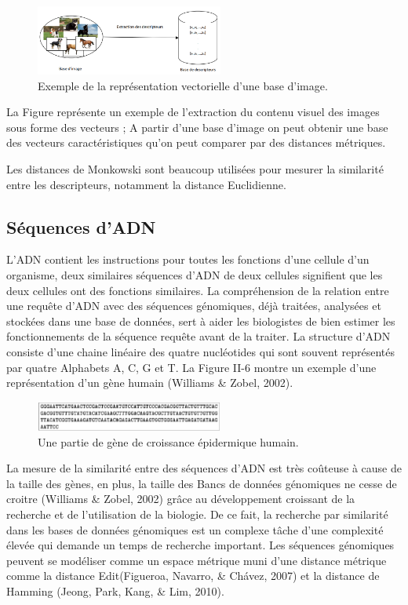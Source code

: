 \begin{figure}[H]
	\centering
	\includegraphics[width=0.55\textwidth]{Figures/extract} %
	\caption{Exemple de la représentation vectorielle d'une base d'image.}
\end{figure}
La Figure  représente un exemple de l’extraction du contenu visuel des images sous
forme des vecteurs ; A partir d’une base d’image on peut obtenir une base des vecteurs
caractéristiques qu’on peut comparer par des distances métriques.

Les distances de Monkowski sont beaucoup utilisées pour mesurer la similarité entre
les descripteurs, notamment la distance Euclidienne. 

\subsection{Séquences d’ADN}
L'ADN contient les instructions pour toutes les fonctions d’une cellule d’un organisme, deux similaires séquences d’ADN de deux cellules signifient que les deux cellules ont des fonctions similaires. La compréhension de la relation entre une requête d’ADN avec des séquences génomiques, déjà traitées, analysées et stockées dans une base de données, sert à aider les biologistes de bien estimer les fonctionnements de la séquence requête avant de la traiter. La structure d’ADN consiste d’une chaine linéaire des quatre nucléotides qui sont souvent représentés par quatre Alphabets A, C, G et T. La Figure II-6 montre un exemple d’une
représentation d’un gène humain (Williams \& Zobel, 2002).

\begin{figure}[H]
	\centering
	\includegraphics[width=0.55\textwidth]{Figures/ADN} %
	\caption{Une partie de gène de croissance épidermique humain.}
\end{figure}
La mesure de la similarité entre des séquences d’ADN est très coûteuse à cause de la taille des gènes, en plus, la taille des Bancs de données génomiques ne cesse de croitre (Williams \& Zobel, 2002) grâce au développement croissant de la recherche et de l’utilisation de la biologie. De ce fait, la recherche par similarité dans les bases de données génomiques est un complexe tâche d’une complexité élevée qui demande un temps de recherche important.
Les séquences génomiques peuvent se modéliser comme un espace métrique muni
d’une distance métrique comme la distance Edit(Figueroa, Navarro, \& Chávez, 2007) et la distance de Hamming (Jeong, Park, Kang, \& Lim, 2010).

